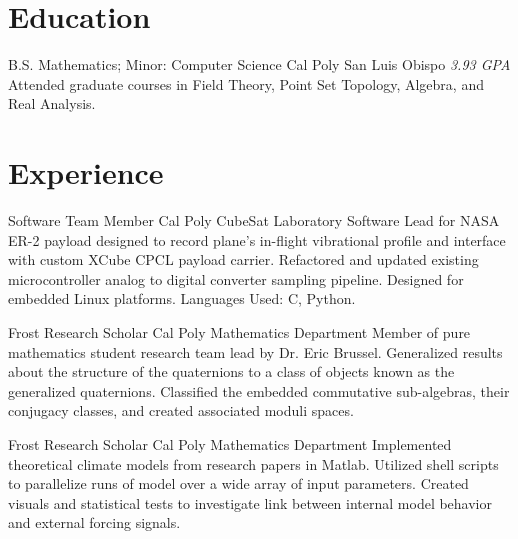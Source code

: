 \documentclass[a4paper, 10pt, sans]{moderncv}
\begin{document}
\makecvtitle

\section{Education}
        {B.S. Mathematics; Minor: Computer Science}
        {Cal Poly}
        {San Luis Obispo}
        {\textit{3.93 GPA}}
        {
            Attended graduate courses in Field Theory, Point Set Topology, Algebra, and Real Analysis. \newline
        }

\section{Experience}

        {Software Team Member}
        {Cal Poly CubeSat Laboratory}{}{}
        {
            Software Lead for NASA ER-2 payload designed to record plane's in-flight vibrational profile and interface with custom XCube CPCL payload carrier.\newline
            Refactored and updated existing microcontroller analog to digital converter sampling pipeline.
            Designed for embedded Linux platforms. Languages Used: C, Python.\newline
        }

        {Frost Research Scholar}
        {Cal Poly Mathematics Department}{}{}
        {
            Member of pure mathematics student research team lead by Dr. Eric Brussel.\newline
            Generalized results about the structure of the quaternions to a class of objects known as the generalized quaternions.\newline
            Classified the embedded commutative sub-algebras, their conjugacy classes, and created associated moduli spaces.\newline 
        }

        {Frost Research Scholar}
        {Cal Poly Mathematics Department}{}{}
        {
            Implemented theoretical climate models from research papers in Matlab.\newline
            Utilized shell scripts to parallelize runs of model over a wide array of input parameters.\newline
            Created visuals and statistical tests to investigate link between internal model behavior and external forcing signals.\newline 
        }
\end{document}
